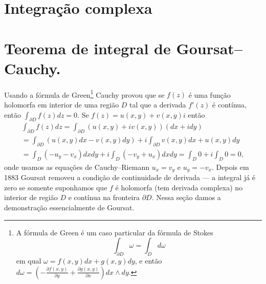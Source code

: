 \section{Integração complexa}

\begin{defin}
\end{defin}

\begin{exem}
\end{exem}

\begin{teorema}
\end{teorema}

\section{Teorema de integral de Goursat--Cauchy.}

\begin{remark}
Usando a fórmula de Green\footnote{
A fórmula de Green é um caso particular da fórmula de Stokes 
$$\int_{\partial D} \omega = \int_D d\omega$$
em qual $\omega = f(x,y) dx + g(x,y) dy$, e então
$d\omega = (-\frac{\partial f(x,y)}{\partial y} + \frac{\partial g(x,y)}{\partial x}) dx\wedge dy$.}
Cauchy provou que se $f(z)$ é uma função holomorfa em interior de uma região $D$
tal que a derivada $f'(z)$ é contínua, então $\int_{\partial D} f(z) dz = 0$.
Se $f(z) = u(x,y) + v(x,y) i$ então
\begin{multline*}
\int_{\partial D} f(z) dz = \int_{\partial D} (u(x,y) + i v(x,y)) (dx + i dy) \\
= \int_{\partial D} (u(x,y) dx - v(x,y) dy) + i \int_{\partial D} v(x,y) dx + u(x,y) dy \\
= \int_D (-u_y-v_x) dx dy + i \int_D (-v_y + u_x) dx dy = \int_D 0 + i \int_D 0 = 0,
\end{multline*}
onde usamos as equações de Cauchy--Riemann $u_x = v_y$ e $u_y = - v_x$.
Depois em 1883 Goursat removeu a condição de continuidade de derivada ---
a integral já é zero se somente suponhamos que $f$ é holomorfa
(tem derivada complexa) no interior de região $D$ e contínua na fronteira $\partial D$.
Nessa seção damos a demonstração essencialmente de Goursat.
\end{remark}

